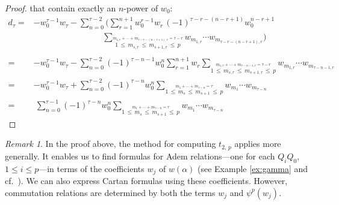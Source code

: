 \documentclass{gtpart}
\theoremstyle{definition}
\theoremstyle{remark}
\newtheorem{rmk}[equation]{Remark}
\newcommand{\A}{\alpha}
\newcommand{\T}{\tau}
\renewcommand{\=}{\approx}
\renewcommand{\-}{\sim}
\numberwithin{equation}{section}
\begin{document}
\begin{proof}
 that contain exactly an $n$-power of $w_0$: 
 \begin{equation*}
  \begin{split}
   d_\T = & -w_0^{\T - 1} w_\T - \sum_{n = 0}^{\T - 2} 
            \Bigg( \sum_{r = 1}^{n + 1} w_0^{r - 1} w_r \, 
            (-1)^{\T - r - (n - r + 1)} w_0^{n - r + 1} \\
          & \qquad\qquad\qquad\qquad\, \sum_{\stackrel{\scriptstyle m_{1,r} 
            + \cdots + m_{\T - r - (n - r + 1),r} = \T - r} 
            {1 \,\leq\, m_{s,r} \,\leq\, m_{s + 1,r} \,\leq\, p}} 
            w_{m_{1,r}} \cdots w_{m_{\T - r - (n - r + 1),r}} \Bigg) \\\\
        = & -w_0^{\T - 1} w_\T - \sum_{n = 0}^{\T - 2} (-1)^{\T - n - 1} w_0^n 
            \sum_{r = 1}^{n + 1} w_r \sum_{\stackrel{\scriptstyle m_{1,r} 
            + \cdots + m_{\T - n - 1,r} = \T - r} 
            {1 \,\leq\, m_{s,r} \,\leq\, m_{s + 1,r} \,\leq\, p}} w_{m_{1,r}} 
            \cdots w_{m_{\T - n - 1,r}} \\
        = & -w_0^{\T - 1} w_\T + \sum_{n = 0}^{\T - 2} (-1)^{\T - n} w_0^n 
            \sum_{\stackrel{\scriptstyle m_1 + \cdots + m_{\T - n} = \T} 
            {1 \,\leq\, m_s \,\leq\, m_{s + 1} \,\leq\, p}} 
            w_{m_1} \cdots w_{m_{\T - n}} \\
        = & ~ \sum_{n = 0}^{\T - 1} (-1)^{\T - n} w_0^n 
            \sum_{\stackrel{\scriptstyle m_1 + \cdots + m_{\T - n} = \T} 
            {1 \,\leq\, m_s \,\leq\, m_{s + 1} \,\leq\, p}} 
            w_{m_1} \cdots w_{m_{\T - n}} 
  \end{split}
 \end{equation*}
\end{proof}

\begin{rmk}
 \label{rmk:Adem}
 In the proof above, the method for computing $t_{2,\,p}$ applies more 
 generally.  It enables us to find formulas for Adem relations---one for each 
 $Q_i Q_0$, $1 \leq i \leq p$---in terms of the coefficients $w_j$ of $w(\A)$ 
 (see Example \ref{ex:gamma} and cf.~\cite[proof of Proposition 3.6\,(iv)]{p3}).  
 We can also express Cartan formulas using these coefficients.  However, 
 commutation relations are determined by both the terms $w_j$ and $\psi^p(w_j)$.  
\end{rmk}
\end{document}
